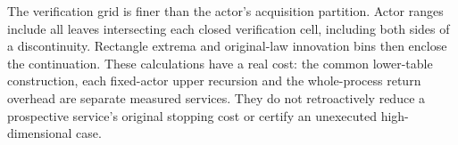 The verification grid is finer than the actor's acquisition partition. Actor ranges include all leaves intersecting each closed verification cell, including both sides of a discontinuity. Rectangle extrema and original-law innovation bins then enclose the continuation. These calculations have a real cost: the common lower-table construction, each fixed-actor upper recursion and the whole-process return overhead are separate measured services. They do not retroactively reduce a prospective service's original stopping cost or certify an unexecuted high-dimensional case.
